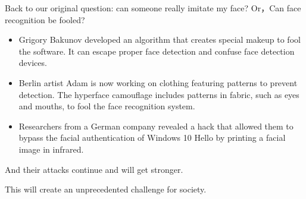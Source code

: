 \documentclass[onecolumn,oneside]{BUPTHomework}
\begin{document}
  Back to our original question: can someone really imitate my face? Or，Can face recognition be fooled?

  \begin{itemize}
    \item Grigory Bakunov developed an algorithm that creates special makeup to fool the software. It can escape proper face detection and confuse face detection devices. 
    \item Berlin artist Adam is now working on clothing featuring patterns to prevent detection. The hyperface camouflage includes patterns in fabric, such as eyes and mouths, to fool the face recognition system.
    \item Researchers from a German company revealed a hack that allowed them to bypass the facial authentication of Windows 10 Hello by printing a facial image in infrared.
  \end{itemize}

  And their attacks continue and will get stronger.

  This will create an unprecedented challenge for society.

  
\end{document}
